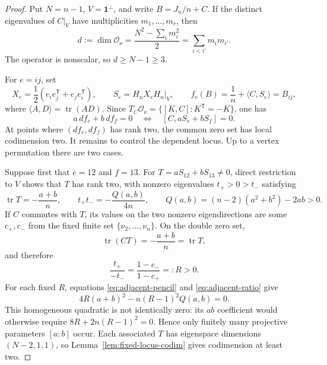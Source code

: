 \documentclass[11pt,reqno]{amsart}
\theoremstyle{definition}
\theoremstyle{remark}
\newcommand{\one}{\mathbf 1}
\begin{document}
\begin{proof}
Put $N=n-1$, $V=\one^\perp$, and write $B=J_n/n+C$.  If the distinct
eigenvalues of $C|_V$ have multiplicities $m_1,\ldots,m_r$, then
\begin{equation}\label{eq:orbit-dimension}
 d:=\dim\mathcal O_\nu
 =\frac{N^2-\sum_i m_i^2}{2}
 =\sum_{i<i'}m_im_{i'}.
\end{equation}
The operator is nonscalar, so $d\ge N-1\ge3$.

For $e=ij$, set
\[
 X_e=\frac12(e_ie_j^{\mathsf T}+e_je_i^{\mathsf T}),
 \qquad S_e=H_nX_eH_n|_V,
 \qquad f_e(B)=\frac1n+\langle C,S_e\rangle=B_{ij},
\]
where $\langle A,D\rangle=\operatorname{tr}(AD)$.  Since
$T_C\mathcal O_\nu=\{[K,C]:K^{\mathsf T}=-K\}$, one has
\begin{equation}\label{eq:commutator-covectors}
 a\,df_e+b\,df_f=0
 \quad\Longleftrightarrow\quad
 [C,aS_e+bS_f]=0.
\end{equation}
At points where $(df_e,df_f)$ has rank two, the common zero set has local
codimension two.  It remains to control the dependent locus.  Up to a vertex
permutation there are two cases.

Suppose first that $e=12$ and $f=13$.  For
$T=aS_{12}+bS_{13}\ne0$, direct restriction to $V$ shows that $T$ has rank
two, with nonzero eigenvalues $t_+>0>t_-$ satisfying
\begin{equation}\label{eq:adjacent-pencil}
 \operatorname{tr}T=-\frac{a+b}{n},
 \qquad
 t_+t_-=-\frac{Q(a,b)}{4n},
 \qquad
 Q(a,b)=(n-2)(a^2+b^2)-2ab>0.
\end{equation}
If $C$ commutes with $T$, its values on the two nonzero eigendirections are
some $c_+,c_-$ from the fixed finite set $\{\nu_2,\ldots,\nu_n\}$.  On the
double zero set,
\[
 \operatorname{tr}(CT)=-\frac{a+b}{n}=\operatorname{tr}T,
\]
and therefore
\begin{equation}\label{eq:adjacent-ratio}
 \frac{t_+}{-t_-}
 =\frac{1-c_-}{1-c_+}=:R>0.
\end{equation}
For each fixed $R$, equations \eqref{eq:adjacent-pencil} and
\eqref{eq:adjacent-ratio} give
\begin{equation}\label{eq:adjacent-projective-equation}
 4R(a+b)^2-n(R-1)^2Q(a,b)=0.
\end{equation}
This homogeneous quadratic is not identically zero: its $ab$ coefficient
would otherwise require $8R+2n(R-1)^2=0$.  Hence only finitely many
projective parameters $[a:b]$ occur.  Each associated $T$ has eigenspace
dimensions $(N-2,1,1)$, so Lemma~\ref{lem:fixed-locus-codim} gives
codimension at least two.


\end{proof}
\end{document}
